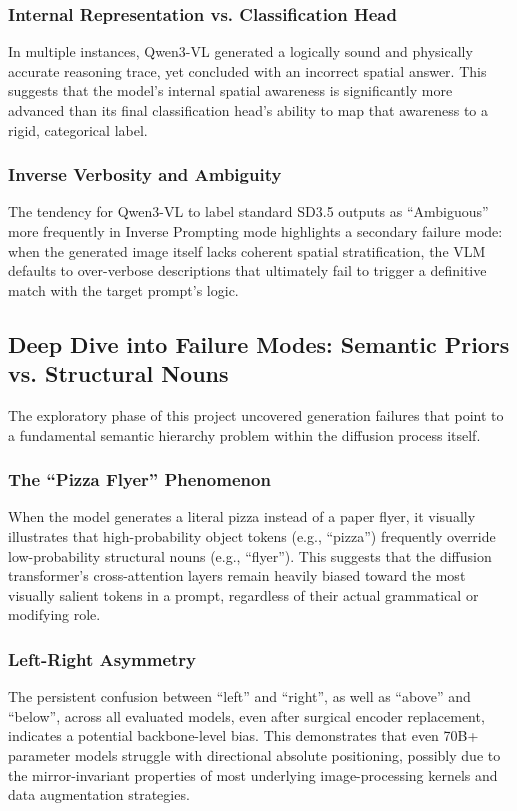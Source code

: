 \subsubsection{Internal Representation vs. Classification Head} 
In multiple instances, Qwen3-VL generated a logically sound and physically accurate reasoning trace, yet concluded with an incorrect spatial answer. This suggests that the model's internal spatial awareness is significantly more advanced than its final classification head's ability to map that awareness to a rigid, categorical label.

\subsubsection{Inverse Verbosity and Ambiguity}
The tendency for Qwen3-VL to label standard SD3.5 outputs as ``Ambiguous'' more frequently in Inverse Prompting mode highlights a secondary failure mode: when the generated image itself lacks coherent spatial stratification, the VLM defaults to over-verbose descriptions that ultimately fail to trigger a definitive match with the target prompt's logic.

\subsection{Deep Dive into Failure Modes: Semantic Priors vs. Structural Nouns}
The exploratory phase of this project uncovered generation failures that point to a fundamental semantic hierarchy problem within the diffusion process itself.

\subsubsection{The ``Pizza Flyer'' Phenomenon}
When the model generates a literal pizza instead of a paper flyer, it visually illustrates that high-probability object tokens (e.g., ``pizza'') frequently override low-probability structural nouns (e.g., ``flyer''). This suggests that the diffusion transformer's cross-attention layers remain heavily biased toward the most visually salient tokens in a prompt, regardless of their actual grammatical or modifying role.

\subsubsection{Left-Right Asymmetry}
The persistent confusion between ``left'' and ``right'', as well as ``above'' and ``below'', across all evaluated models, even after surgical encoder replacement, indicates a potential backbone-level bias. This demonstrates that even 70B+ parameter models struggle with directional absolute positioning, possibly due to the mirror-invariant properties of most underlying image-processing kernels and data augmentation strategies.

